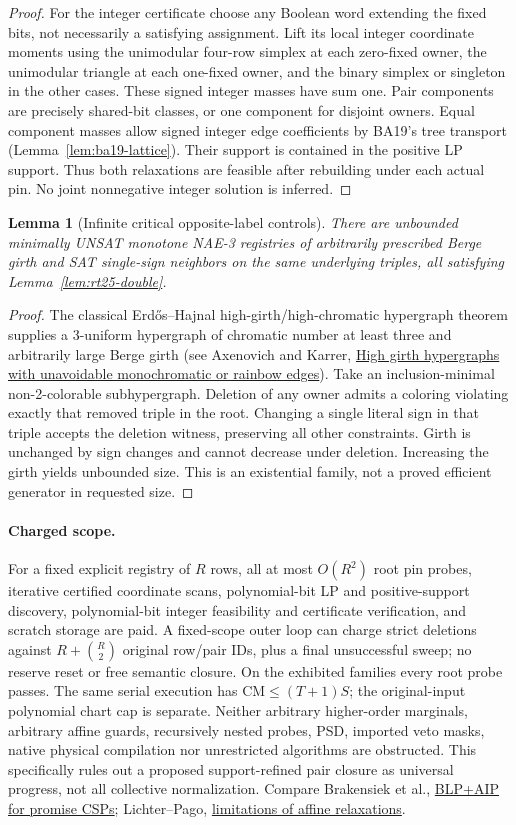\documentclass[11pt]{article}
\newtheorem{lemma}[theorem]{Lemma}
\begin{document}
\begin{proof}
For the integer certificate choose any Boolean word extending the fixed bits, not necessarily a satisfying assignment. Lift its local integer coordinate moments using the unimodular four-row simplex at each zero-fixed owner, the unimodular triangle at each one-fixed owner, and the binary simplex or singleton in the other cases. These signed integer masses have sum one. Pair components are precisely shared-bit classes, or one component for disjoint owners. Equal component masses allow signed integer edge coefficients by BA19's tree transport (Lemma~\ref{lem:ba19-lattice}). Their support is contained in the positive LP support. Thus both relaxations are feasible after rebuilding under each actual pin. No joint nonnegative integer solution is inferred.
\end{proof}
\begin{lemma}[Infinite critical opposite-label controls]\label{lem:rt25-neighbors}
There are unbounded minimally UNSAT monotone NAE-3 registries of arbitrarily prescribed Berge girth and SAT single-sign neighbors on the same underlying triples, all satisfying Lemma~\ref{lem:rt25-double}.
\end{lemma}
\begin{proof}
The classical Erd\H{o}s--Hajnal high-girth/high-chromatic hypergraph theorem supplies a 3-uniform hypergraph of chromatic number at least three and arbitrarily large Berge girth (see Axenovich and Karrer, \href{https://arxiv.org/abs/1607.06600}{High girth hypergraphs with unavoidable monochromatic or rainbow edges}). Take an inclusion-minimal non-2-colorable subhypergraph. Deletion of any owner admits a coloring violating exactly that removed triple in the root. Changing a single literal sign in that triple accepts the deletion witness, preserving all other constraints. Girth is unchanged by sign changes and cannot decrease under deletion. Increasing the girth yields unbounded size. This is an existential family, not a proved efficient generator in requested size.
\end{proof}
\paragraph{Charged scope.}
For a fixed explicit registry of $R$ rows, all at most $O(R^2)$ root pin probes, iterative certified coordinate scans, polynomial-bit LP and positive-support discovery, polynomial-bit integer feasibility and certificate verification, and scratch storage are paid. A fixed-scope outer loop can charge strict deletions against $R+\binom R2$ original row/pair IDs, plus a final unsuccessful sweep; no reserve reset or free semantic closure. On the exhibited families every root probe passes. The same serial execution has $\mathrm{CM}\le(T+1)S$; the original-input polynomial chart cap is separate. Neither arbitrary higher-order marginals, arbitrary affine guards, recursively nested probes, PSD, imported veto masks, native physical compilation nor unrestricted algorithms are obstructed. This specifically rules out a proposed support-refined pair closure as universal progress, not all collective normalization. Compare Brakensiek et al., \href{https://doi.org/10.1137/20M1312745}{BLP+AIP for promise CSPs}; Lichter--Pago, \href{https://arxiv.org/abs/2407.09097}{limitations of affine relaxations}.
\end{document}
